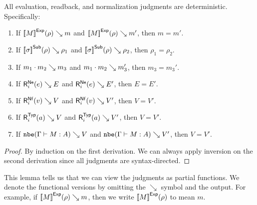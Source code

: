 \begin{lemma}[Determinacy]
  All evaluation, readback, and normalization judgments are deterministic.
  Specifically:
  \begin{enumerate}
  \item If ${[\![M]\!]}^{\mathsf{Exp}}(\rho) \searrow m$ and ${[\![M]\!]}^{\mathsf{Exp}}(\rho) \searrow m'$, then $m = m'$.
  \item If ${[\![\sigma]\!]}^{\mathsf{Sub}}(\rho) \searrow \rho_1$ and ${[\![\sigma]\!]}^{\mathsf{Sub}}(\rho) \searrow \rho_2$, then $\rho_1 = \rho_2$.
  \item If $m_1 \cdot m_2 \searrow m_3$ and $m_1 \cdot m_2 \searrow m_3'$, then $m_3 = m_3'$.
  \item If $\rbne e E$ and $\rbne e {E'}$, then $E = E'$.
  \item If $\rbnf v V$ and $\rbnf v {V'}$, then $V = V'$.
  \item If $\rbtyp a V$ and $\rbtyp a {V'}$, then $V = V'$.
  \item If $\texttt{nbe}(\Gamma \vdash M : A) \searrow V$ and $\texttt{nbe}(\Gamma \vdash M : A) \searrow V'$, then $V = V'$.
  \end{enumerate}
\end{lemma}
\begin{proof}
  By induction on the first derivation.
  We can always apply inversion on the second derivation since all judgments are syntax-directed.
\end{proof}

This lemma tells us that we can view the judgments as partial functions.
We denote the functional versions by omitting the $\searrow$ symbol and the output.
For example, if ${[\![M]\!]}^{\mathsf{Exp}}(\rho) \searrow m$, then we write ${[\![M]\!]}^{\mathsf{Exp}}(\rho)$ to mean $m$.
